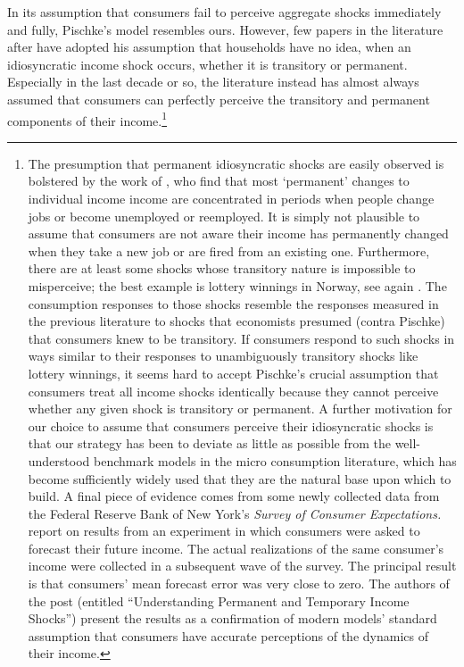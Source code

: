 \documentclass[titlepage]{\econtex}\newcommand{\texname}{cAndCwithStickyE}
\begin{document}
In its assumption that consumers fail to perceive aggregate shocks immediately and fully, Pischke's model resembles ours.  However, few papers in the literature after \cite{pischkeMicroMacro} have adopted his assumption that households have no idea, when an idiosyncratic income shock occurs, whether it is transitory or permanent.  Especially in the last decade or so, the literature instead has almost always assumed that consumers can perfectly perceive the transitory and permanent components of their income.\footnote{The presumption that permanent idiosyncratic shocks are easily observed is bolstered by the work of \cite{lmp:wagerisk}, who find that most `permanent' changes to individual income income are concentrated in periods when people change jobs or become unemployed or reemployed.  It is simply not plausible to assume that consumers are not aware their income has permanently changed when they take a new job or are fired from an existing one.  Furthermore, there are at least some shocks whose transitory nature is impossible to misperceive; the best example is lottery winnings in Norway, see again \cite{fhnMPC}.  The consumption responses to those shocks resemble the responses measured in the previous literature to shocks that economists presumed (contra Pischke) that consumers knew to be transitory.  If consumers respond to such shocks in ways similar to their responses to unambiguously transitory shocks like lottery winnings, it seems hard to accept Pischke's crucial assumption that consumers treat all income shocks identically because they cannot perceive whether any given shock is transitory or permanent. A further motivation for our choice to assume that consumers perceive their idiosyncratic shocks is that our strategy has been to deviate as little as possible from the well-understood benchmark models in the micro consumption literature, which has become sufficiently widely used that they are the natural base upon which to build.  A final piece of evidence comes from some newly collected data from the Federal Reserve Bank of New York's {\it Survey of Consumer Expectations.}  \cite{kmpIncomeExpectations} report on results from an experiment in which consumers were asked to forecast their future income.  The actual realizations of the same consumer's income were collected in a subsequent wave of the survey.  The principal result is that consumers' mean forecast error was very close to zero.  The authors of the post (entitled ``Understanding Permanent and Temporary Income Shocks'') present the results as a confirmation of modern models' standard assumption that consumers have accurate perceptions of the dynamics of their income.}
\end{document}
